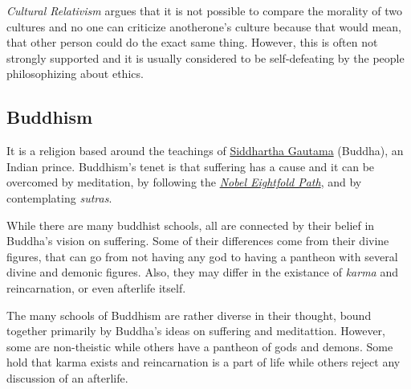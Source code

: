 \documentclass[../my_knowledge.tex]{subfiles}
\begin{document}
\textit{Cultural Relativism} argues that it is not possible to compare the morality of two cultures and no one can criticize anotherone's culture because that would mean, that other person could do the exact same thing. However, this is often not strongly supported and it is usually considered to be self-defeating by the people philosophizing about ethics. 

\subsection{Buddhism}
It is a religion based around the teachings of \href{https://www.youtube.com/watch?v=tilBs32zN7I}{Siddhartha Gautama} (Buddha), an Indian prince. Buddhism's tenet is that suffering has a cause and it can be overcomed by meditation, by following the \href{https://en.wikipedia.org/wiki/Noble_Eightfold_Path}{\textit{Nobel Eightfold Path}}, and by contemplating \textit{sutras}.

While there are many buddhist schools, all are connected by their belief in Buddha's vision on suffering. Some of their differences come from their divine figures, that can go from not having any god to having a pantheon with several divine and demonic figures. Also, they may differ in the existance of \textit{karma} and reincarnation, or even afterlife itself.

The many schools of Buddhism are rather diverse in their thought, bound together primarily by Buddha’s ideas on suffering and meditattion. However, some are non-theistic while others have a pantheon of gods and demons. Some hold that karma exists and reincarnation is a part of life while others reject any discussion of an afterlife.
\end{document}
